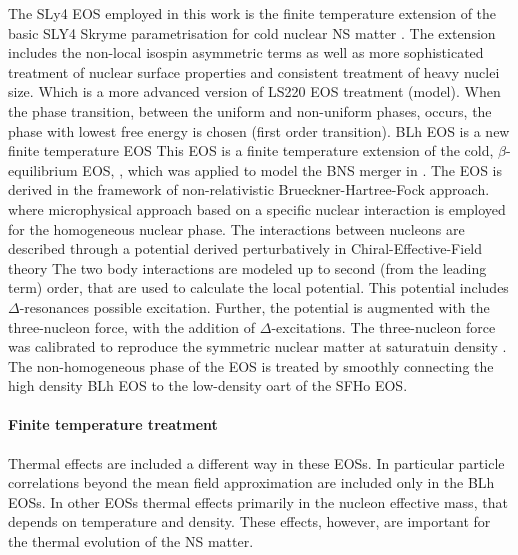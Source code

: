 \begin{itemize}
    The SLy4 \ac{EOS} employed in this work is the finite temperature extension \citep{daSilvaSchneider:2017jpg}
    of the basic SLY4 Skryme parametrisation for cold nuclear \ac{NS} matter \citep{Douchin:2001sv}.
    The extension includes the non-local isospin asymmetric terms as well as more sophisticated 
    treatment of nuclear surface properties and consistent treatment of heavy nuclei size. 
    Which is a more advanced version of LS220 \ac{EOS} treatment (model).
    When the phase transition, between the uniform and non-uniform phases, occurs, the phase with lowest 
    free energy is chosen (first order transition).
    BLh \ac{EOS} is a new finite temperature \ac{EOS} \citep{Logoteta:2020yxf}
    This \ac{EOS} is a finite temperature extension of the cold, $\beta$-equilibrium \ac{EOS}, \citep{Bombaci:2018ksa},
    which was applied to model the \ac{BNS} merger in \citet{Endrizzi:2018uwl}.
    The \ac{EOS} is derived in the framework of non-relativistic Brueckner-Hartree-Fock approach.
    where microphysical approach based on a specific nuclear interaction is employed for the homogeneous nuclear phase.
    The interactions between nucleons are described through a potential derived perturbatively 
    in Chiral-Effective-Field theory \citep{Machleidt:2011zz}
    The two body interactions are modeled up to second (from the leading term) order, that are used to calculate the local potential. This potential includes $\Delta$-resonances possible excitation. 
    Further, the potential is augmented with the three-nucleon force, with the addition of $\Delta$-excitations.
    The three-nucleon force was calibrated to reproduce the symmetric nuclear matter at saturatuin density \cite{Logoteta:2016nzc}.
    The non-homogeneous phase of the \ac{EOS} is treated by smoothly connecting the high density 
    BLh \ac{EOS} to the low-density oart of the SFHo \ac{EOS}.
\end{itemize}



\paragraph{Finite temperature treatment}

Thermal effects are included a different way in these \acp{EOS}. 
In particular particle correlations beyond the mean field approximation are included only in the BLh \acp{EOS}.
In other \acp{EOS} thermal effects primarily in the nucleon effective mass, that depends on temperature and density.
These effects, however, are important for the thermal evolution of the NS matter.

